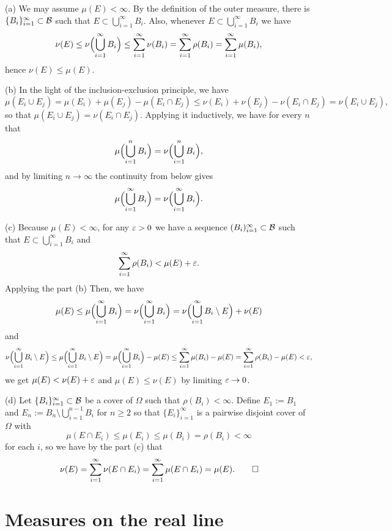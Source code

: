 \documentclass{../../large}
\begin{document}
\begin{pf}
(a)
We may assume $\mu(E)<\infty$.
By the definition of the outer measure, there is $\{B_i\}_{i=1}^\infty\subset\mathcal{B}$ such that $E\subset\bigcup_{i=1}^\infty B_i$.
Also, whenever $E\subset\bigcup_{i=1}^\infty B_i$ we have
\[\nu(E)\le\nu\Bigl(\bigcup_{i=1}^\infty B_i\Bigr)\le\sum_{i=1}^\infty\nu(B_i)=\sum_{i=1}^\infty\rho(B_i)=\sum_{i=1}^\infty\mu(B_i),\]
hence $\nu(E)\le\mu(E)$.

(b)
In the light of the inclusion-exclusion principle, we have
\[\mu(E_i\cup E_j)=\mu(E_i)+\mu(E_j)-\mu(E_i\cap E_j)\le\nu(E_i)+\nu(E_j)-\nu(E_i\cap E_j)=\nu(E_i\cup E_j),\]
so that $\mu(E_i\cup E_j)=\nu(E_i\cap E_j)$.
Applying it inductively, we have for every $n$ that
\[\mu\Bigl(\bigcup_{i=1}^nB_i\Bigr)=\nu\Bigl(\bigcup_{i=1}^nB_i\Bigr),\]
and by limiting $n\to\infty$ the continuity from below gives
\[\mu\Bigl(\bigcup_{i=1}^\infty B_i\Bigr)=\nu\Bigl(\bigcup_{i=1}^\infty B_i\Bigr).\]

(c)
Because $\mu(E)<\infty$, for any $\varepsilon>0$ we have a sequence $(B_i)_{i=1}^\infty\subset\mathcal{B}$ such that $E\subset\bigcup_{i=1}^\infty B_i$ and
\[\sum_{i=1}^\infty\rho(B_i)<\mu(E)+\varepsilon.\]
Applying the part (b) 
Then, we have
\[\mu(E)\le\mu\Bigl(\bigcup_{i=1}^\infty B_i\Bigr)=\nu\Bigl(\bigcup_{i=1}^\infty B_i\Bigr)=\nu\Bigl(\bigcup_{i=1}^\infty B_i\setminus E\Bigr)+\nu(E)\]
and
\[\nu\Bigl(\bigcup_{i=1}^\infty B_i\setminus E\Bigr)
\le\mu\Bigl(\bigcup_{i=1}^\infty B_i\setminus E\Bigr)
=\mu\Bigl(\bigcup_{i=1}^\infty B_i\Bigr)-\mu(E)
\le\sum_{i=1}^\infty\mu(B_i)-\mu(E)=\sum_{i=1}^\infty\rho(B_i)-\mu(E)<\varepsilon,\]
we get $\mu(E)<\nu(E)+\varepsilon$ and $\mu(E)\le\nu(E)$ by limiting $\varepsilon\to0$.

(d)
Let $\{B_i\}_{i=1}^\infty\subset\mathcal{B}$ be a cover of $\Omega$ such that $\rho(B_i)<\infty$.
Define $E_1:=B_1$ and $E_n:=B_n\setminus\bigcup_{i=1}^{n-1}B_i$ for $n\ge2$ so that $\{E_i\}_{i=1}^\infty$ is a pairwise disjoint cover of $\Omega$ with
\[\mu(E\cap E_i)\le\mu(E_i)\le\mu(B_i)=\rho(B_i)<\infty\]
for each $i$, so we have by the part (c) that
\[\nu(E)=\sum_{i=1}^\infty\nu(E\cap E_i)=\sum_{i=1}^\infty\mu(E\cap E_i)=\mu(E).\qedhere\]
\end{pf}



\section{Measures on the real line}


\begin{prb}
\end{prb}
\end{document}
